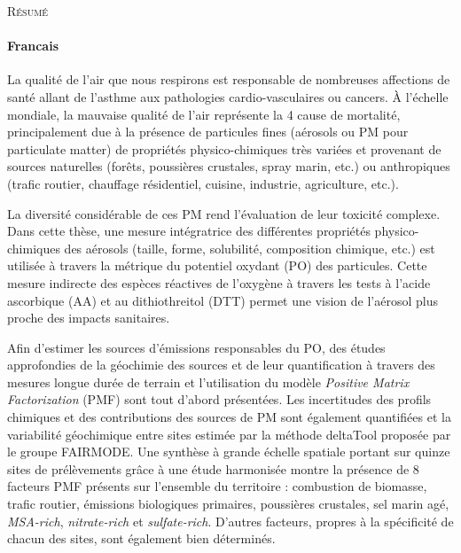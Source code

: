 \begin{center}
    \Huge\textsc{Résumé}
\end{center}

\paragraph{Francais}%
\label{par:francais}

La qualité de l'air que nous respirons est responsable de nombreuses affections de santé allant de
l'asthme aux pathologies cardio-vasculaires ou cancers. À l'échelle mondiale, la mauvaise
qualité de l'air représente la
4\ieme{} cause de mortalité, principalement due à la
présence de particules fines (aérosols ou PM pour particulate matter) de propriétés physico-chimiques très
variées et
provenant de sources naturelles (forêts, poussières crustales, spray marin, etc.) ou
anthropiques (trafic routier, chauffage résidentiel, cuisine, industrie, agriculture,
etc.).

La diversité considérable de ces PM rend l'évaluation de leur toxicité complexe. Dans
cette thèse, 
une mesure intégratrice des différentes propriétés physico-chimiques des
aérosols (taille, forme, solubilité, composition chimique, etc.) est utilisée à travers la
métrique du potentiel oxydant (PO) des particules.
Cette mesure indirecte des espèces réactives de l'oxygène à travers les tests à l'acide
ascorbique (AA) et au dithiothreitol (DTT) permet une vision de l'aérosol plus proche des
impacts sanitaires.

Afin d'estimer les sources d'émissions responsables du PO, des études approfondies de la
géochimie des sources et de leur quantification à travers des mesures longue durée de
terrain et l'utilisation du modèle \textit{Positive Matrix Factorization} (PMF) sont tout
d'abord présentées. Les incertitudes des profils chimiques et des contributions
des sources de PM sont également quantifiées et la variabilité géochimique entre sites
estimée par la méthode deltaTool proposée par le groupe FAIRMODE. Une synthèse à grande
échelle spatiale portant sur quinze sites de prélèvements grâce à une étude harmonisée
montre la présence de 8 facteurs PMF présents sur l'ensemble du territoire : combustion de
biomasse, trafic routier, émissions biologiques primaires, poussières crustales, sel marin
agé, \textit{MSA-rich}, \textit{nitrate-rich} et \textit{sulfate-rich}. D'autres facteurs,
propres à la spécificité de chacun des sites, sont également bien déterminés.

